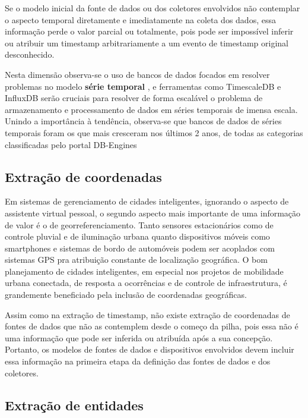 Se o modelo inicial da fonte de dados ou dos coletores envolvidos não contemplar o aspecto temporal diretamente e imediatamente na coleta dos dados, essa informação perde o valor parcial ou totalmente, pois pode ser impossível inferir ou atribuir um timestamp arbitrariamente a um evento de timestamp original desconhecido.

Nesta dimensão observa-se o uso de bancos de dados focados em resolver problemas no modelo \textbf{série temporal} \cite{influxdata:explained}, e ferramentas como TimescaleDB \cite{timescaledb} e InfluxDB \cite{influxdb} serão cruciais para resolver de forma escalável o problema de armazenamento e processamento de dados em séries temporais de imensa escala. Unindo a importância à tendência, observa-se que bancos de dados de séries temporais foram os que mais cresceram nos últimos 2 anos, de todas as categorias classificadas pelo portal DB-Engines \cite{dbengines:trends}

\subsection{Extração de coordenadas} \label{ss:extracao_de_coordenadas}

Em sistemas de gerenciamento de cidades inteligentes, ignorando o aspecto de assistente virtual pessoal, o segundo aspecto mais importante de uma informação de valor é o de georreferenciamento. Tanto sensores estacionários como de controle pluvial e de iluminação urbana quanto dispositivos móveis como smartphones e sistemas de bordo de automóveis podem ser acoplados com sistemas GPS pra atribuição constante de localização geográfica. O bom planejamento de cidades inteligentes, em especial nos projetos de mobilidade urbana conectada, de resposta a ocorrências e de controle de infraestrutura, é grandemente beneficiado pela inclusão de coordenadas geográficas.

Assim como na extração de timestamp, não existe extração de coordenadas de fontes de dados que não as contemplem desde o começo da pilha, pois essa não é uma informação que pode ser inferida ou atribuída após a sua concepção. Portanto, os modelos de fontes de dados e dispositivos envolvidos devem incluir essa informação na primeira etapa da definição das fontes de dados e dos coletores.

\subsection{Extração de entidades} \label{ss:extracao_de_entidades}

